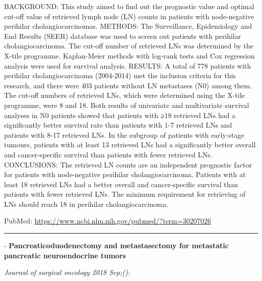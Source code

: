 \documentclass[]{article}
\begin{document}
BACKGROUND: This study aimed to find out the prognostic value and
optimal cut-off value of retrieved lymph node (LN) counts in patients
with node-negative perihilar cholangiocarcinomas. METHODS: The
Surveillance, Epidemiology and End Results (SEER) database was used to
screen out patients with perihilar cholangiocarcinoma. The cut-off
number of retrieved LNs was determined by the X-tile programme.
Kaplan-Meier methods with log-rank tests and Cox regression analysis
were used for survival analysis. RESULTS: A total of 778 patients with
perihilar cholangiocarcinoma (2004-2014) met the inclusion criteria for
this research, and there were 403 patients without LN metastases (N0)
among them. The cut-off numbers of retrieved LNs, which were determined
using the X-tile programme, were 8 and 18. Both results of univariate
and multivariate survival analyses in N0 patients showed that patients
with ≥18 retrieved LNs had a significantly better survival rate than
patients with 1-7 retrieved LNs and patients with 8-17 retrieved LNs. In
the subgroup of patients with early-stage tumours, patients with at
least 13 retrieved LNs had a significantly better overall and
cancer-specific survival than patients with fewer retrieved LNs.
CONCLUSIONS: The retrieved LN counts are an independent prognostic
factor for patients with node-negative perihilar cholangiocarcinoma.
Patients with at least 18 retrieved LNs had a better overall and
cancer-specific survival than patients with fewer retrieved LNs. The
minimum requirement for retrieving of LNs should reach 18 in perihilar
cholangiocarcinoma.

PubMed: \url{https://www.ncbi.nlm.nih.gov/pubmed/?term=30207026}

{}

{}

\begin{center}\rule{0.5\linewidth}{\linethickness}\end{center}

 - \textbf{Pancreaticoduodenectomy and metastasectomy for metastatic
pancreatic neuroendocrine tumors}

\emph{Journal of surgical oncology 2018 Sep;():}
\end{document}
